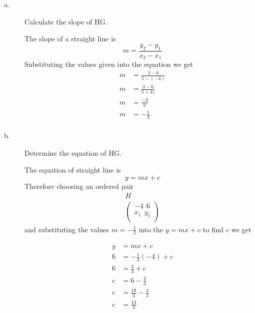 \documentclass{article}
\begin{document}
\begin{description}
    \item[a.] \begin{large}Calculate the slope of HG.\end{large}

        The slope of a straight line is
        $$
            m = \frac{y_2 - y_1}{x_2-x_1}
        $$
        Substituting the values given into the equation we get
        $$
            \begin{aligned}
                m & = \frac{3-6}{5-(-4)} \\
                m & = \frac{3-6}{5+4)}   \\
                m & = \frac{-3}{9}       \\
                m & = -\frac{1}{3}       \\
            \end{aligned}
        $$

    \item[b.] \begin{large}Determine the equation of HG.\end{large}

        The equation of straight line is
        $$
            y = mx + c
        $$
        Therefore choosing an ordered pair
        $$
            \begin{array}{c}
                H \\
                \begin{pmatrix}
                    -4 \ \ 6    \\
                    x_1 \ \ y_1 \\
                \end{pmatrix}
            \end{array}
        $$
        and substituting the values $m=-\frac{1}{3}$ into the $y=mx+c$ to find $c$ we get

        $$
            \begin{aligned}
                y & = mx + c                   \\
                6 & = -\frac{1}{3}(-4) + c     \\
                6 & = \frac{4}{3} + c          \\
                c & = 6 - \frac{4}{3}          \\
                c & = \frac{18}{3}-\frac{4}{3} \\
                c & = \frac{14}{3}             \\
            \end{aligned}
        $$


\end{description}
\end{document}
